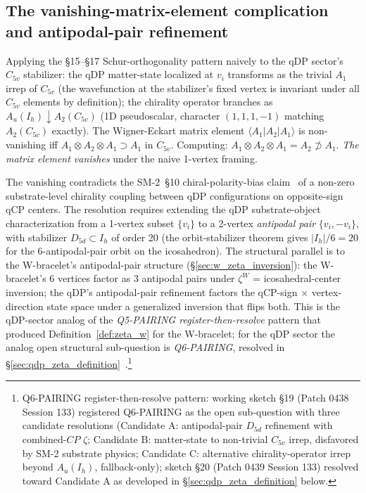 \documentclass[11pt,letterpaper]{article}
\begin{document}
\subsection{The vanishing-matrix-element complication and antipodal-pair refinement}\label{sec:q6_pairing_registration}

Applying the §15--§17 Schur-orthogonality pattern naively to the qDP sector's $C_{5v}$ stabilizer: the qDP matter-state localized at $v_i$ transforms as the trivial $A_1$ irrep of $C_{5v}$ (the wavefunction at the stabilizer's fixed vertex is invariant under all $C_{5v}$ elements by definition); the chirality operator branches as $A_u(I_h) \downarrow A_2(C_{5v})$ (1D pseudoscalar, character $(1,1,1,-1)$ matching $A_2(C_{5v})$ exactly). The Wigner-Eckart matrix element $\langle A_1 | A_2 | A_1 \rangle$ is non-vanishing iff $A_1 \otimes A_2 \otimes A_1 \supset A_1$ in $C_{5v}$. Computing: $A_1 \otimes A_2 \otimes A_1 = A_2 \not\supset A_1$. \emph{The matrix element vanishes} under the naive 1-vertex framing.

The vanishing contradicts the SM-2~\S10 chiral-polarity-bias claim~\cite{abshier_sm2} of a non-zero substrate-level chirality coupling between qDP configurations on opposite-sign qCP centers. The resolution requires extending the qDP substrate-object characterization from a 1-vertex subset $\{v_i\}$ to a 2-vertex \emph{antipodal pair} $\{v_i, -v_i\}$, with stabilizer $D_{5d} \subset I_h$ of order 20 (the orbit-stabilizer theorem gives $|I_h|/6 = 20$ for the 6-antipodal-pair orbit on the icosahedron). The structural parallel is to the W-bracelet's antipodal-pair structure (\S\ref{sec:w_zeta_inversion}): the W-bracelet's 6 vertices factor as 3 antipodal pairs under $\zeta^W$ = icosahedral-center inversion; the qDP's antipodal-pair refinement factors the qCP-sign $\times$ vertex-direction state space under a generalized inversion that flips both. This is the qDP-sector analog of the \emph{Q5-PAIRING register-then-resolve} pattern that produced Definition~\ref{def:zeta_w} for the W-bracelet; for the qDP sector the analog open structural sub-question is \emph{Q6-PAIRING}, resolved in \S\ref{sec:qdp_zeta_definition}~\cite{abshier_capotauro_chiral_mechanism_sketch}.\footnote{Q6-PAIRING register-then-resolve pattern: working sketch \S19 (Patch 0438 Session 133) registered Q6-PAIRING as the open sub-question with three candidate resolutions (Candidate A: antipodal-pair $D_{5d}$ refinement with combined-$CP$ $\zeta$; Candidate B: matter-state to non-trivial $C_{5v}$ irrep, disfavored by SM-2 substrate physics; Candidate C: alternative chirality-operator irrep beyond $A_u(I_h)$, fallback-only); sketch \S20 (Patch 0439 Session 133) resolved toward Candidate A as developed in \S\ref{sec:qdp_zeta_definition} below.}
\end{document}
